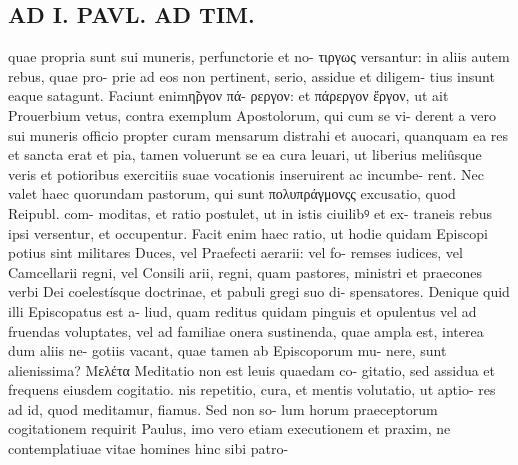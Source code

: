 \documentclass{article}
\begin{document}
\begin{pages}
\section*{AD I. PAVL. AD TIM. }
\marginpar{[ p.430 ]}quae propria sunt sui muneris, perfunctorie et no- τιργως versantur: in aliis autem rebus, quae pro- prie ad eos non pertinent, serio, assidue et diligem- tius insunt eaque satagunt. Faciunt enimη̃ργον πά- ρεργον: et πάρεργον ἔργον, ut ait Prouerbium vetus, contra exemplum Apostolorum, qui cum se vi- derent a vero sui muneris officio propter curam mensarum distrahi et auocari, quanquam ea res et sancta erat et pia, tamen voluerunt se ea cura leuari, ut liberius meliûsque veris et potioribus exercitiis suae vocationis inseruirent ac incumbe- rent. Nec valet haec quorundam pastorum, qui sunt πολυπράγμονςς excusatio, quod Reipubl. com- moditas, et ratio postulet, ut in istis ciuilibꝰ et ex- traneis rebus ipsi versentur, et occupentur. Facit enim haec ratio, ut hodie quidam Episcopi potius sint militares Duces, vel Praefecti aerarii: vel fo- remses iudices, vel Camcellarii regni, vel Consili arii, regni, quam pastores, ministri et praecones verbi Dei coelestísque doctrinae, et pabuli gregi suo di- spensatores. Denique quid illi Episcopatus est a- liud, quam reditus quidam pinguis et opulentus vel ad fruendas voluptates, vel ad familiae onera sustinenda, quae ampla est, interea dum aliis ne- gotiis vacant, quae tamen ab Episcoporum mu- nere, sunt alienissima? Μελέτα Meditatio non est leuis quaedam co- gitatio, sed assidua et frequens eiusdem cogitatio. nis repetitio, cura, et mentis volutatio, ut aptio- res ad id, quod meditamur, fiamus. Sed non so- lum horum praeceptorum cogitationem requirit Paulus, imo vero etiam executionem et praxim, ne contemplatiuae vitae homines hinc sibi patro- 

\end{pages}
\end{document}
